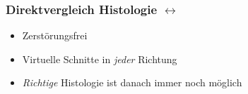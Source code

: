 
\begin{frame}
	\frametitle{Direktvergleich Histologie \(\leftrightarrow\) \uct}
	\begin{itemize}
		\item Zerstörungsfrei
		\item Virtuelle Schnitte in \emph{jeder} Richtung
		\item \emph{Richtige} Histologie ist danach immer noch möglich
	\end{itemize}
\end{frame}

